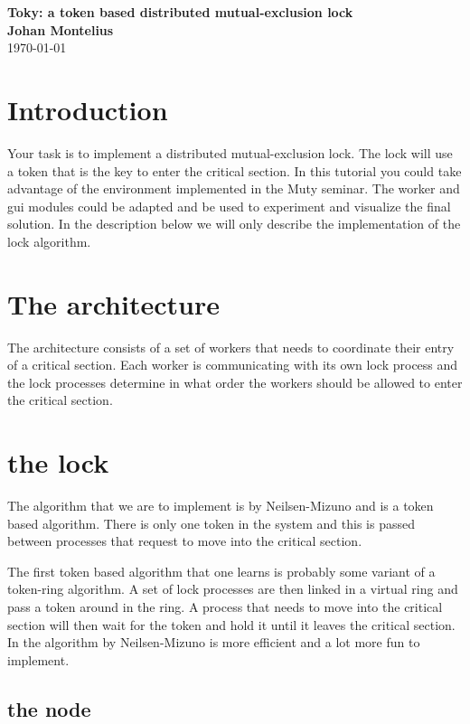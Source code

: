 \documentclass[a4paper, 11pt]{article}
\newcommand{\nnsection}[1]{
\section*{#1}
\addcontentsline{toc}{section}{#1}
}
\begin{document}
\begin{center}
\vspace{20pt}
\textbf{\large Toky: a token based distributed mutual-exclusion lock}\\
\vspace{10pt}
\textbf{Johan Montelius}\\
\vspace{10pt}
\today{}
\end{center}

\nnsection{Introduction}

Your task is to implement a distributed mutual-exclusion lock. The
lock will use a token that is the key to enter the critical
section. In this tutorial you could take advantage of the environment
implemented in the Muty seminar. The worker and gui modules could be
adapted and be used to experiment and visualize the final solution. In the
description below we will only describe the implementation of the lock
algorithm.

\section{The architecture}

The architecture consists of a set of workers that needs to coordinate
their entry of a critical section. Each worker is communicating with
its own lock process and the lock processes determine in what order
the workers should be allowed to enter the critical section.


\section{the lock}

The algorithm that we are to implement is by Neilsen-Mizuno and is a
token based algorithm. There is only one token in the system and this
is passed between processes that request to move into the critical
section.

The first token based algorithm that one learns is probably some
variant of a token-ring algorithm. A set of lock processes are then
linked in a virtual ring and pass a token around in the ring. A
process that needs to move into the critical section will then wait
for the token and hold it until it leaves the critical section. In
the algorithm by Neilsen-Mizuno is more efficient and a lot more fun
to implement.

\subsection{the node}
\end{document}
